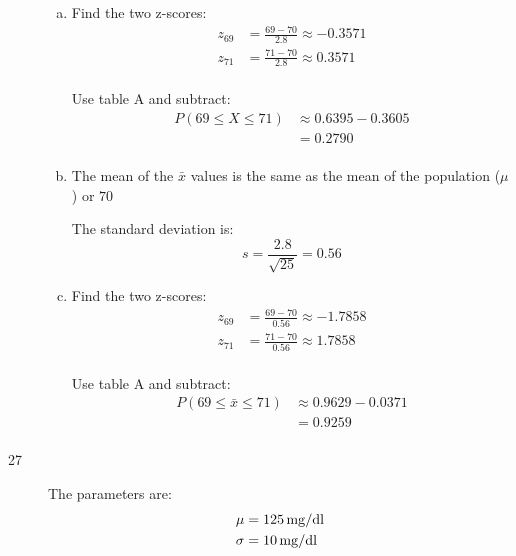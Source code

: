 \documentclass[letterpaper, landscape]{exam}
\begin{document}
\begin{description}
        \begin{enumerate}[(a)]
          \item Find the two z-scores:
            \begin{align*}
              z_{69} &= \frac{69 - 70}{2.8} \approx -0.3571 \\
              z_{71} &= \frac{71 - 70}{2.8} \approx 0.3571 \\
            \end{align*}

            Use table A and subtract:
            \begin{align*}
              P(69 \leq X \leq 71) & \approx 0.6395 - 0.3605 \\
                                   & = \boxed{ 0.2790 } \\
            \end{align*}

          \item 
            The mean of the $\bar{x}$ values is the same as the mean of the
            population ($\mu$) or $\boxed{ 70 }$

            The standard deviation is:
            \[
              s = \frac{2.8}{\sqrt{25}} = \boxed{ 0.56 }
            \]

          \item Find the two z-scores:
            \begin{align*}
              z_{69} &= \frac{69 - 70}{0.56} \approx -1.7858 \\
              z_{71} &= \frac{71 - 70}{0.56} \approx 1.7858 \\
            \end{align*}

            Use table A and subtract:
            \begin{align*}
              P(69 \leq \bar{x} \leq 71) & \approx 0.9629 - 0.0371 \\
                                         & = \boxed{ 0.9259 } \\
            \end{align*}

        \end{enumerate}

      \item[27]
        The parameters are:
        \begin{align*}
          \mu    & = \unit[125]{mg/dl} \\
          \sigma & = \unit[10]{mg/dl} \\
        \end{align*}


\end{description}
\end{document}
